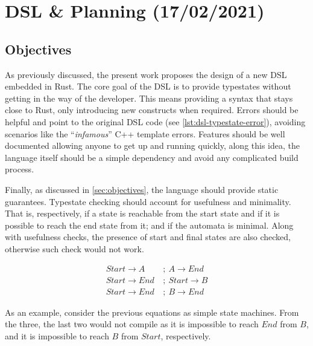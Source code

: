 \chapter{DSL \& Planning (17/02/2021)}\label{cha:planning}


\section{Objectives}

As previously discussed, the present work proposes the design of a new DSL embedded in Rust.
The core goal of the DSL is to provide typestates without getting in the way of the developer.
This means providing a syntax that stays close to Rust, only introducing new constructs when required.
Errors should be helpful and point to the original DSL code (see \autoref{lst:dsl-typestate-error}), avoiding scenarios like the “\emph{infamous}” C++ template errors.
Features should be well documented allowing anyone to get up and running quickly,
along this idea, the language itself should be a simple dependency and avoid any complicated build process.

Finally, as discussed in \autoref{sec:objectives}, the language should provide static guarantees.
Typestate checking should account for usefulness and minimality.
That is, respectively, if a state is reachable from the start state and if it is possible to reach the end state from it;
and if the automata is minimal.
Along with usefulness checks, the presence of start and final states are also checked,
otherwise such check would not work.

\begin{align}
    Start \rightarrow A~   & ;~A \rightarrow End   \\
    Start \rightarrow End~ & ;~Start \rightarrow B \\
    Start \rightarrow End~ & ;~B \rightarrow End
\end{align}

As an example, consider the previous equations as simple state machines.
From the three, the last two would not compile as it is impossible to reach $End$ from $B$, and it is impossible to reach $B$ from $Start$, respectively.

